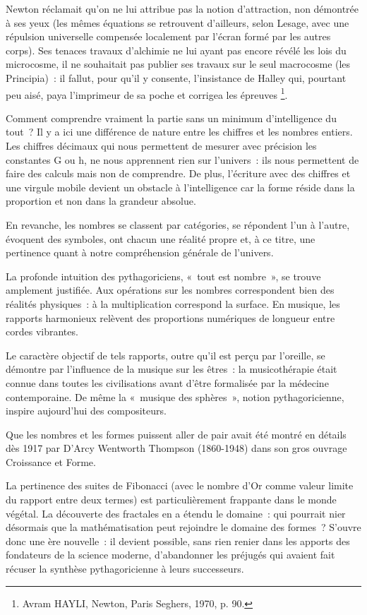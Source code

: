 \documentclass[a4paper,12pt]{article}
\begin{document}
Newton réclamait qu'on ne lui attribue pas la notion d'attraction, non démontrée à ses yeux (les mêmes équations se retrouvent d’ailleurs, selon Lesage, avec une répulsion universelle compensée localement par l'écran formé par les autres corps). Ses tenaces travaux d’alchimie ne lui ayant pas encore révélé les lois du microcosme, il ne souhaitait pas publier ses travaux sur le seul macrocosme (les Principia) : il fallut, pour qu’il y consente, l’insistance de Halley qui, pourtant peu aisé, paya l’imprimeur de sa poche et corrigea les épreuves \footnote{Avram HAYLI, Newton, Paris Seghers, 1970, p. 90.}. 

Comment comprendre vraiment la partie sans un minimum d'intelligence du tout ? Il y a ici une différence de nature entre les chiffres et les nombres entiers. Les chiffres décimaux qui nous permettent de mesurer avec précision les constantes G ou h, ne nous apprennent rien sur l'univers : ils nous permettent de faire des calculs mais non de comprendre. De plus, l’écriture avec des chiffres et une virgule mobile devient un obstacle à l’intelligence car la forme réside dans la proportion et non dans la grandeur absolue. 

En revanche, les nombres se classent par catégories, se répondent l’un à l'autre, évoquent des symboles, ont chacun une réalité propre et, à ce titre, une pertinence quant à notre compréhension générale de l'univers.

	La profonde intuition des pythagoriciens, « tout est nombre », se trouve amplement justifiée. Aux opérations sur les nombres correspondent bien des réalités physiques : à la multiplication correspond la surface. En musique, les rapports harmonieux relèvent des proportions numériques de longueur entre cordes vibrantes. 
  
  Le caractère objectif de tels rapports, outre qu’il est perçu par l’oreille, se démontre par l’influence de la musique sur les êtres : la musicothérapie était connue dans toutes les civilisations avant d’être formalisée par la médecine contemporaine. De même la « musique des sphères », notion pythagoricienne, inspire aujourd’hui des compositeurs. 
  
  Que les nombres et les formes puissent aller de pair avait été montré en détails dès 1917 par D’Arcy Wentworth Thompson (1860-1948) dans son gros ouvrage Croissance et Forme. 
  
  La pertinence des suites de Fibonacci (avec le nombre d’Or comme valeur limite du rapport entre deux termes) est particulièrement frappante dans le monde végétal. La découverte des fractales en a étendu le domaine : qui pourrait nier désormais que la mathématisation peut rejoindre le domaine des formes ? 
	S’ouvre donc une ère nouvelle : il devient possible, sans rien renier dans les apports des fondateurs de la science moderne, d’abandonner les préjugés qui avaient fait récuser la synthèse pythagoricienne à leurs successeurs. 
  
\end{document}
